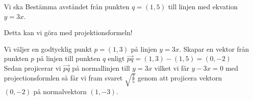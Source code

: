 \documentclass[../../main.tex]{subfiles}
\begin{document}
\begin{solution}{25} 

 Vi ska Bestämma avståndet från punkten $q=(1,5)$ till linjen med ekvation $y = 3x$.

Detta kan vi göra med projektionsformeln! 

Vi väljer en godtycklig punkt $p=(1,3)$ på linjen $y = 3x$. 
Skapar en vektor från punkten $p$ på linjen till punkten $q$ enligt $\Vec{pq}=(1,3)-(1,5)=(0,-2)$
Sedan projicerar vi $\Vec{pq}$ på normallinjen till $y = 3x$ vilket vi får $y - 3x=0$  med projectionsformlen så får vi fram svaret $\sqrt{\frac{2}{5}}$ genom att projicera vektorn $(0,-2)$ på normalvektorn $(1,-3)$.

\end{solution}
\end{document}
